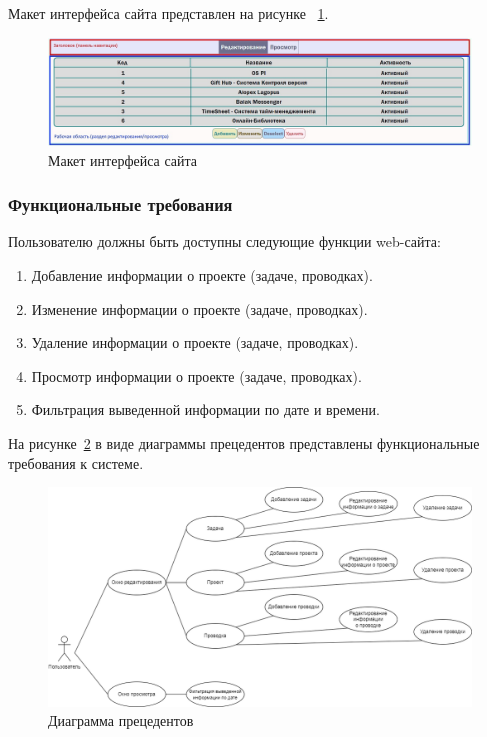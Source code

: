 Макет интерфейса сайта представлен на рисунке ~\ref{fig:templ}.

\begin{figure}[H]
	\centering
	\includegraphics[width=1\linewidth]{images/templ}
	\caption{Макет интерфейса сайта}
	\label{fig:templ}
\end{figure}

\subsubsection{Функциональные требования}
Пользователю должны быть доступны следующие функции web-сайта:
\begin{enumerate}
	\item Добавление информации о проекте (задаче, проводках).
	\item Изменение информации о проекте (задаче, проводках).
	\item Удаление информации о проекте (задаче, проводках).
	\item Просмотр информации о проекте (задаче, проводках).
	\item Фильтрация выведенной информации по дате и времени.
\end{enumerate}


На рисунке~\ref{fig:precedents} в виде диаграммы прецедентов представлены функциональные требования к системе.


\begin{figure}[H]
	\centering
	\includegraphics[width=1\linewidth]{images/precedents}
	\caption{Диаграмма прецедентов}
	\label{fig:precedents}
\end{figure}

